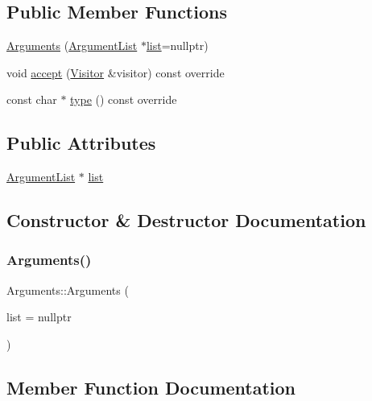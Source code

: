 \subsection*{Public Member Functions}
\begin{DoxyCompactItemize}
\item 
\hyperlink{struct_arguments_a3ef5b61e1012059e49adb9743c7abcb0}{Arguments} (\hyperlink{struct_argument_list}{Argument\+List} $\ast$\hyperlink{struct_arguments_a05f7d1acffd6f78b6aa33f62dd7984af}{list}=nullptr)
\item 
void \hyperlink{struct_arguments_ac4fa9c45af3f2e9f0b989ed7718fc75d}{accept} (\hyperlink{struct_visitor}{Visitor} \&visitor) const override
\item 
const char $\ast$ \hyperlink{struct_arguments_ace630c05708ff98216542b3b495b07d4}{type} () const override
\end{DoxyCompactItemize}
\subsection*{Public Attributes}
\begin{DoxyCompactItemize}
\item 
\hyperlink{struct_argument_list}{Argument\+List} $\ast$ \hyperlink{struct_arguments_a05f7d1acffd6f78b6aa33f62dd7984af}{list}
\end{DoxyCompactItemize}


\subsection{Constructor \& Destructor Documentation}
\mbox{\label{struct_arguments_a3ef5b61e1012059e49adb9743c7abcb0}} 
\subsubsection{\texorpdfstring{Arguments()}{Arguments()}}
{\footnotesize\ttfamily Arguments\+::\+Arguments (\begin{DoxyParamCaption}\item[{\hyperlink{struct_argument_list}{Argument\+List} $\ast$}]{list = {\ttfamily nullptr} }\end{DoxyParamCaption})\hspace{0.3cm}{\ttfamily [inline]}}



\subsection{Member Function Documentation}
\mbox{\label{struct_arguments_ac4fa9c45af3f2e9f0b989ed7718fc75d}} 
